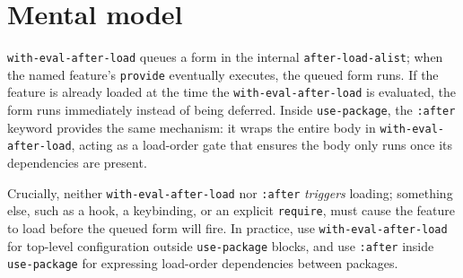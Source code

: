 \section{Mental model}
\texttt{with-eval-after-load} queues a form in the internal \texttt{after-load-alist}; when the named feature's \texttt{provide} eventually executes, the queued form runs.  If the feature is already loaded at the time the \texttt{with-eval-after-load} is evaluated, the form runs immediately instead of being deferred.  Inside \texttt{use-package}, the \texttt{:after} keyword provides the same mechanism: it wraps the entire body in \texttt{with-eval-after-load}, acting as a load-order gate that ensures the body only runs once its dependencies are present.

Crucially, neither \texttt{with-eval-after-load} nor \texttt{:after} \emph{triggers} loading; something else, such as a hook, a keybinding, or an explicit \texttt{require}, must cause the feature to load before the queued form will fire.  In practice, use \texttt{with-eval-after-load} for top-level configuration outside \texttt{use-package} blocks, and use \texttt{:after} inside \texttt{use-package} for expressing load-order dependencies between packages.
